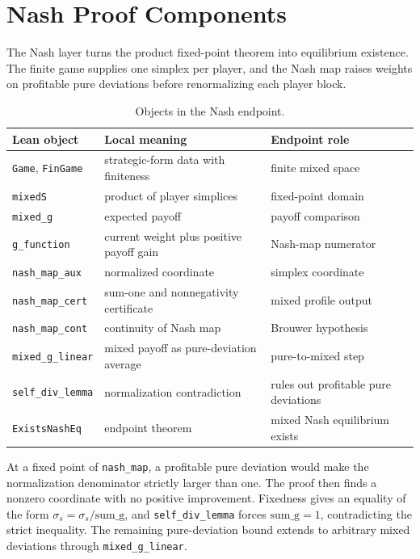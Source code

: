 \documentclass{article}
\theoremstyle{definition}
\begin{document}
\clearpage
\section{Nash Proof Components}
\label{app:nash-details}

The Nash layer turns the product fixed-point theorem into equilibrium existence. The finite game supplies one simplex per player, and the Nash map raises weights on profitable pure deviations before renormalizing each player block.

\begin{table}[H]
\caption{Objects in the Nash endpoint.}
\label{tab:appendix-nash-components}
\begin{center}
    \begin{small}
      \begin{tabular}{lll}
\toprule
Lean object & Local meaning & Endpoint role \\
\midrule
\texttt{Game}, \texttt{FinGame} & strategic-form data with finiteness & finite mixed space \\
\texttt{mixedS} & product of player simplices & fixed-point domain \\
\texttt{mixed\_g} & expected payoff & payoff comparison \\
\texttt{g\_function} & current weight plus positive payoff gain & Nash-map numerator \\
\texttt{nash\_map\_aux} & normalized coordinate & simplex coordinate \\
\texttt{nash\_map\_cert} & sum-one and nonnegativity certificate & mixed profile output \\
\texttt{nash\_map\_cont} & continuity of Nash map & Brouwer hypothesis \\
\texttt{mixed\_g\_linear} & mixed payoff as pure-deviation average & pure-to-mixed step \\
\texttt{self\_div\_lemma} & normalization contradiction & rules out profitable pure deviations \\
\texttt{ExistsNashEq} & endpoint theorem & mixed Nash equilibrium exists \\
\bottomrule
\end{tabular}
    \end{small}
  \end{center}
  \vskip -0.1in
\end{table}

At a fixed point of \texttt{nash\_map}, a profitable pure deviation would make the normalization denominator strictly larger than one. The proof then finds a nonzero coordinate with no positive improvement. Fixedness gives an equality of the form \(\sigma_s=\sigma_s/\mathrm{sum\_g}\), and \texttt{self\_div\_lemma} forces \(\mathrm{sum\_g}=1\), contradicting the strict inequality. The remaining pure-deviation bound extends to arbitrary mixed deviations through \texttt{mixed\_g\_linear}.
\end{document}
